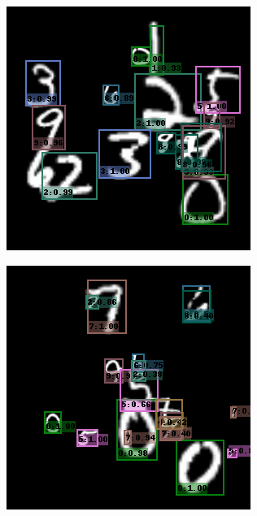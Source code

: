 \begin{figure}[h!]
\begin{subfigure}[b]{0.193\textwidth}
    \end{subfigure}
    \hfill
    \begin{subfigure}[b]{0.193\textwidth}
        \centering
        \includegraphics[width=\textwidth]{Images/mnist_output/10.png}
    \end{subfigure}
    \hfill
    \begin{subfigure}[b]{0.193\textwidth}
        \centering
        \includegraphics[width=\textwidth]{Images/mnist_output/11.png}

\end{subfigure}
\end{figure}
